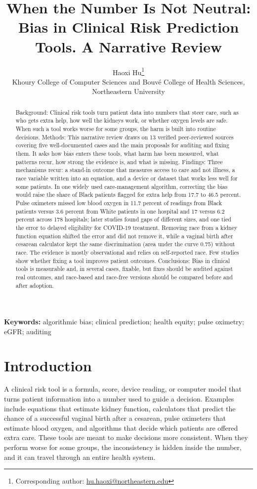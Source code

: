 \documentclass[12pt]{article}
\title{When the Number Is Not Neutral: Bias in Clinical Risk Prediction Tools. A Narrative Review}
\author{Haoxi Hu\thanks{Corresponding author: \href{mailto:hu.haoxi@northeastern.edu}{hu.haoxi@northeastern.edu}}\\[2pt]
\small Khoury College of Computer Sciences and Bouv\'e College of Health Sciences,\\
\small Northeastern University}
\date{}
\begin{document}
\maketitle
\vspace{-2em}
\begin{abstract}
Background: Clinical risk tools turn patient data into numbers that steer care, such as who gets extra help, how well the kidneys work, or whether oxygen levels are safe. When such a tool works worse for some groups, the harm is built into routine decisions. Methods: This narrative review draws on 13 verified peer-reviewed sources covering five well-documented cases and the main proposals for auditing and fixing them. It asks how bias enters these tools, what harm has been measured, what patterns recur, how strong the evidence is, and what is missing. Findings: Three mechanisms recur: a stand-in outcome that measures access to care and not illness, a race variable written into an equation, and a device or dataset that works less well for some patients. In one widely used care-management algorithm, correcting the bias would raise the share of Black patients flagged for extra help from 17.7 to 46.5 percent. Pulse oximeters missed low blood oxygen in 11.7 percent of readings from Black patients versus 3.6 percent from White patients in one hospital and 17 versus 6.2 percent across 178 hospitals; later studies found gaps of different sizes, and one tied the error to delayed eligibility for COVID-19 treatment. Removing race from a kidney function equation shifted the error and did not remove it, while a vaginal birth after cesarean calculator kept the same discrimination (area under the curve 0.75) without race. The evidence is mostly observational and relies on self-reported race. Few studies show whether fixing a tool improves patient outcomes. Conclusions: Bias in clinical tools is measurable and, in several cases, fixable, but fixes should be audited against real outcomes, and race-based and race-free versions should be compared before and after adoption.
\end{abstract}
\noindent\textbf{Keywords:} algorithmic bias; clinical prediction; health equity; pulse oximetry; eGFR; auditing

\section*{Introduction}
A clinical risk tool is a formula, score, device reading, or computer model that turns patient information into a number used to guide a decision. Examples include equations that estimate kidney function, calculators that predict the chance of a successful vaginal birth after a cesarean, pulse oximeters that estimate blood oxygen, and algorithms that decide which patients are offered extra care. These tools are meant to make decisions more consistent. When they perform worse for some groups, the inconsistency is hidden inside the number, and it can travel through an entire health system.
\end{document}
